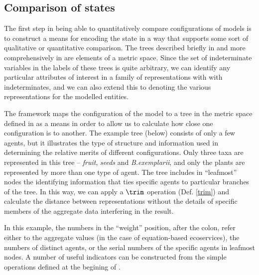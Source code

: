 \subsection{Comparison of states}
The first step in being able to quantitatively compare configurations
of models is to construct a means for encoding the state in a way that
supports some sort of qualitative or quantitative comparison.  The
trees described briefly in \Cthree and more comprehensively in \Cfour
are elements of a metric space. Since the set of indeterminate
variables in the labels of these trees is quite arbitrary, we can
identify any particular attributes of interest in a family of
representations with with indeterminates, and we can also extend this
to denoting the various representations for the modelled entities.

The framework maps the configuration of the model to a tree in the
metric space defined in \Cfour as a means in order to allow us to
calculate how close one configuration is to another.  The example tree
(below) consists of only a few agents, but it illustrates the
type of structure and information used in determining the relative
merits of different configurations. Only three taxa are represented in
this tree -- \emph{fruit}, \emph{seeds} and \emph{B.exemplarii}, and
only the plants are represented by more than one type of agent.
The tree includes in ``leafmost'' nodes the identifying information
that ties specific agents to particular branches of the tree.  In this
way, we can apply a $\trim$ operation (Def. \ref{trim}) and calculate
the distance between representations without the details of specific
members of the aggregate data interfering in the result.

In this example, the numbers in the ``weight'' position, after the
colon, refer either to the aggregate values (in the case of
equation-based ecoservices), the numbers of distinct agents, or the
serial numbers of the specific agents in leafmost nodes.  A number of
useful indicators can be constructed from the simple operations
defined at the begining of \Cfour.

